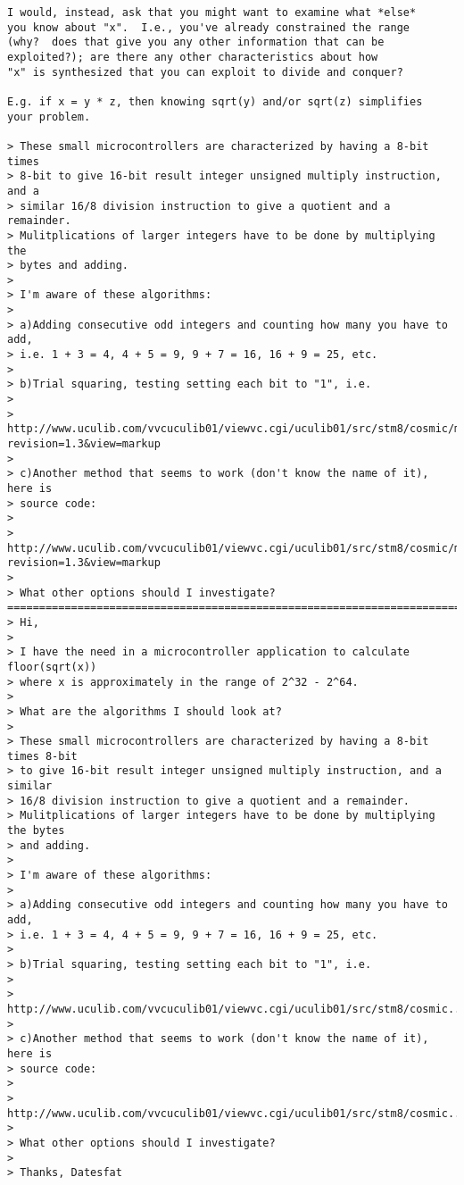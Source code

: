 \begin{tiny}
\begin{verbatim}
I would, instead, ask that you might want to examine what *else*
you know about "x".  I.e., you've already constrained the range
(why?  does that give you any other information that can be
exploited?); are there any other characteristics about how
"x" is synthesized that you can exploit to divide and conquer?

E.g. if x = y * z, then knowing sqrt(y) and/or sqrt(z) simplifies
your problem.

> These small microcontrollers are characterized by having a 8-bit times 
> 8-bit to give 16-bit result integer unsigned multiply instruction, and a 
> similar 16/8 division instruction to give a quotient and a remainder. 
> Mulitplications of larger integers have to be done by multiplying the 
> bytes and adding.
> 
> I'm aware of these algorithms:
> 
> a)Adding consecutive odd integers and counting how many you have to add, 
> i.e. 1 + 3 = 4, 4 + 5 = 9, 9 + 7 = 16, 16 + 9 = 25, etc.
> 
> b)Trial squaring, testing setting each bit to "1", i.e.
> 
> http://www.uculib.com/vvcuculib01/viewvc.cgi/uculib01/src/stm8/cosmic/modxx/atu8sqrtfrxx/src/atu8sqrtfrxx.c?revision=1.3&view=markup 
> 
> c)Another method that seems to work (don't know the name of it), here is 
> source code:
> 
> http://www.uculib.com/vvcuculib01/viewvc.cgi/uculib01/src/stm8/cosmic/modxx/atu16sqrtx10frxx/src/atu16sqrtx10frxx.c?revision=1.3&view=markup 
> 
> What other options should I investigate?
================================================================================
> Hi,
>
> I have the need in a microcontroller application to calculate floor(sqrt(x))
> where x is approximately in the range of 2^32 - 2^64.
>
> What are the algorithms I should look at?
>
> These small microcontrollers are characterized by having a 8-bit times 8-bit
> to give 16-bit result integer unsigned multiply instruction, and a similar
> 16/8 division instruction to give a quotient and a remainder.
> Mulitplications of larger integers have to be done by multiplying the bytes
> and adding.
>
> I'm aware of these algorithms:
>
> a)Adding consecutive odd integers and counting how many you have to add,
> i.e. 1 + 3 = 4, 4 + 5 = 9, 9 + 7 = 16, 16 + 9 = 25, etc.
>
> b)Trial squaring, testing setting each bit to "1", i.e.
>
> http://www.uculib.com/vvcuculib01/viewvc.cgi/uculib01/src/stm8/cosmic...
>
> c)Another method that seems to work (don't know the name of it), here is
> source code:
>
> http://www.uculib.com/vvcuculib01/viewvc.cgi/uculib01/src/stm8/cosmic...
>
> What other options should I investigate?
>
> Thanks, Datesfat


\end{verbatim}
\end{tiny}
